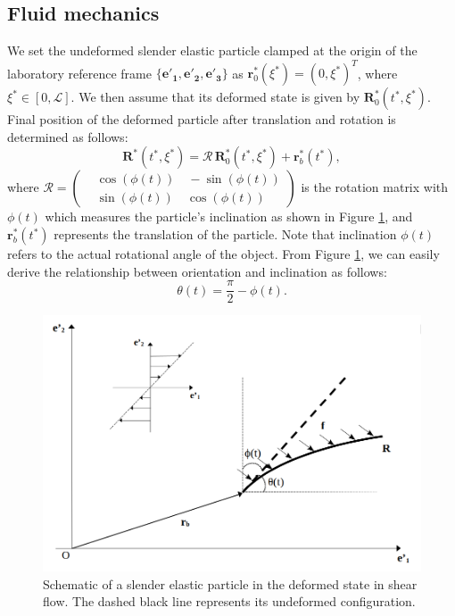 \documentclass[12pt,MSc,twoside]{muthesis_2020}
\begin{document}
\subsection{Fluid mechanics}
We set the undeformed slender elastic particle clamped at the origin of the laboratory reference frame $\{\mathbf{e'_1}, \mathbf{e'_2}, \mathbf{e'_3}\}$ as
$\mathbf{r}_0^*(\xi^*)=(0,\xi^*)^T$, where $\xi^*\in [0,\mathcal{L}]$. We then assume that its deformed state is given by $\mathbf{R}_0^*(t^*,\xi^*)$. 
Final position of the deformed particle after translation and rotation is determined as follows:
\begin{equation}
	\label{eqn:19}
\mathbf{R}^*(t^*,\xi^*)=\bm{\mathcal{R}}\,\mathbf{R}_0^*(t^*,\xi^*)+\mathbf{r}_b^*(t^*),
\end{equation}
where $\bm{\mathcal{R}}=\left(\begin{aligned}
		&\cos(\phi(t))\quad -\sin(\phi(t)) \\
		&\sin(\phi(t))\quad \cos(\phi(t))
	\end{aligned}\right)$ is the rotation matrix with $\phi(t)$ which measures the particle's inclination as shown in Figure \ref{fig:5}, and $\textbf{r}_b^*(t^*)$ represents the translation of the particle. Note that inclination $\phi(t)$ refers to the actual rotational angle of the object. From Figure \ref{fig:5}, we can easily derive the relationship between orientation and inclination as follows:
\begin{equation}
	\label{eqn:20}
\theta(t)=\frac{\pi}{2}-\phi(t).
\end{equation}
\begin{figure}[htb]
	\begin{center}
		\includegraphics[width=1\textwidth]{plot/fluid_general.png}
		\caption{Schematic of a slender elastic particle in the deformed state in shear flow. The dashed black line represents its undeformed configuration.}
    \label{fig:5}
	\end{center}
\end{figure}
\end{document}

